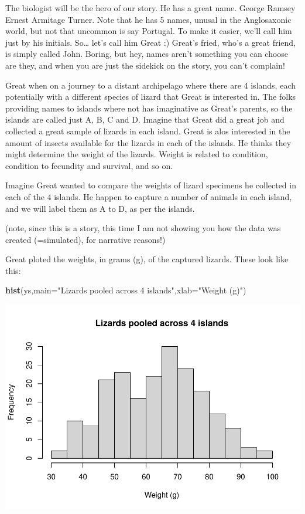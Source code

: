 \documentclass[
]{book}
\newenvironment{Shaded}{\begin{snugshade}}{\end{snugshade}}
\newcommand{\AttributeTok}[1]{\textcolor[rgb]{0.13,0.29,0.53}{#1}}
\newcommand{\FunctionTok}[1]{\textcolor[rgb]{0.13,0.29,0.53}{\textbf{#1}}}
\newcommand{\NormalTok}[1]{#1}
\newcommand{\StringTok}[1]{\textcolor[rgb]{0.31,0.60,0.02}{#1}}
\begin{document}
The biologist will be the hero of our story. He has a great name. George Ramsey Ernest Armitage Turner. Note that he has 5 names, unusal in the Anglosaxonic world, but not that uncommon is say Portugal. To make it easier, we'll call him just by his initials. So\ldots{} let's call him Great :) Great's fried, who's a great friend, is simply called John. Boring, but hey, names aren't something you can choose are they, and when you are just the sidekick on the story, you can't complain!

Great when on a journey to a distant archipelago where there are 4 islands, each potentially with a different species of lizard that Great is interested in. The folks providing names to islands where not has imaginative as Great's parents, so the islands are called just A, B, C and D. Imagine that Great did a great job and collected a great sample of lizards in each island. Great is alos interested in the amount of insects available for the lizards in each of the islands. He thinks they might determine the weight of the lizards. Weight is related to condition, condition to fecundity and survival, and so on.

Imagine Great wanted to compare the weights of lizard specimens he collected in each of the 4 islands. He happen to capture a number of animals in each island, and we will label them as A to D, as per the islands.

(note, since this is a story, this time I am not showing you how the data was created (=simulated), for narrative reasons!)

Great ploted the weights, in grams (g), of the captured lizards. These look like this:

\begin{Shaded}
\begin{Highlighting}[]
\FunctionTok{hist}\NormalTok{(ys,}\AttributeTok{main=}\StringTok{"Lizards pooled across 4 islands"}\NormalTok{,}\AttributeTok{xlab=}\StringTok{"Weight (g)"}\NormalTok{)}
\end{Highlighting}
\end{Shaded}

\includegraphics{ECOMODbook_files/figure-latex/a10.2-1.pdf}
\end{document}
